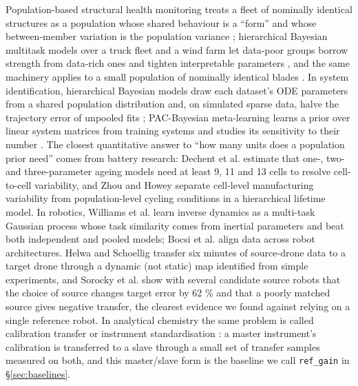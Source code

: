Population-based structural health monitoring treats a fleet of
nominally identical structures as a population whose shared behaviour is
a ``form'' and whose between-member variation is the population variance
\cite{bull2021pbshm}; hierarchical Bayesian multitask models over a
truck fleet and a wind farm let data-poor groups borrow strength from
data-rich ones and tighten interpretable parameters
\cite{bull2022fleet}, and the same machinery applies to a small
population of nominally identical blades \cite{dardeno2024frf}. In
system identification, hierarchical Bayesian models draw each dataset's
ODE parameters from a shared population distribution and, on simulated
sparse data, halve the trajectory error of unpooled fits
\cite{brugnara2026hierarchical}; PAC-Bayesian meta-learning learns a
prior over linear system matrices from training systems and studies its
sensitivity to their number \cite{huang2026pacbayes}. The closest
quantitative answer to ``how many units does a population prior need''
comes from battery research: Dechent et al.
\cite{dechent2021samplesize} estimate that one-, two- and
three-parameter ageing models need at least 9, 11 and 13 cells to
resolve cell-to-cell variability, and Zhou and Howey
\cite{zhou2023battery} separate cell-level manufacturing variability
from population-level cycling conditions in a hierarchical lifetime
model. In robotics, Williams et al. \cite{williams2008mtgp} learn
inverse dynamics as a multi-task Gaussian process whose task similarity
comes from inertial parameters and beat both independent and pooled
models; Bocsi et al. \cite{bocsi2013alignment} align data across robot
architectures. Helwa and Schoellig \cite{helwa2017transfer} transfer
six minutes of source-drone data to a target drone through a dynamic
(not static) map identified from simple experiments, and Sorocky et al.
\cite{sorocky2020selection} show with several candidate source robots
that the choice of source changes target error by 62 \% and that a
poorly matched source gives negative transfer, the clearest evidence we
found against relying on a single reference robot. In analytical chemistry the
same problem is called calibration transfer or instrument
standardisation
\cite{wang1991standardization, feudale2002transfer, workman2018transfer}:
a master instrument's calibration is transferred to a slave through a
small set of transfer samples measured on both, and this master/slave
form is the baseline we call \texttt{ref\_gain} in
§\ref{sec:baselines}.

